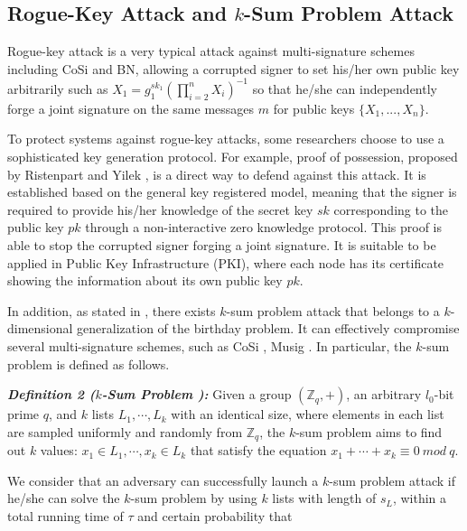 \documentclass[journal]{IEEEtran}
\begin{document}
\subsection{Rogue-Key Attack and \(k\)-Sum Problem Attack}

Rogue-key attack is a very typical attack against multi-signature schemes including CoSi and BN, allowing a corrupted signer to set his/her own public key arbitrarily such as \(X_1=g_1^{sk_1}(\prod_{i=2}^{n} X_i)^{-1}\) so that he/she can independently forge a joint signature on the same messages \(m\) for public keys \(\{X_1,...,X_n\}\).

To protect systems against rogue-key attacks, some researchers choose to use a sophisticated key generation protocol. For example, proof of possession, proposed by Ristenpart and Yilek \cite{05DBLP:conf/eurocrypt/RistenpartY07}, is a direct way to defend against this attack.
It is established based on the general key registered model, meaning that the signer is required to provide his/her knowledge of the secret key \(sk\) corresponding to the public key \(pk\) through a non-interactive zero knowledge protocol. This proof is able to stop the corrupted signer forging a joint signature. It is suitable to be applied in Public Key Infrastructure (PKI), where each node has its certificate showing the information about its own public key \(pk\).

In addition, as stated in \cite{03drijverssecurity}, there exists \(k\)-sum problem attack that belongs to a \(k\)-dimensional generalization of the birthday problem. It can effectively compromise several multi-signature schemes, such as CoSi \cite{02DBLP:conf/sp/SytaTVWJGGKF16}, Musig \cite{DBLP:journals/dcc/MaxwellPSW19}. In particular, the \(k\)-sum problem is defined as follows.

\noindent\emph{\bf Definition 2 (\(k\)-Sum Problem \cite{03drijverssecurity}):} Given a group \((\mathbb{Z}_q,+)\), an arbitrary \(l_0\)-bit prime \(q\), and \(k\) lists  \(L_1,\cdots,L_k\) with an identical size, where elements in each list are sampled uniformly and randomly from \(\mathbb{Z}_q\), the \(k\)-sum problem aims to find out \(k\) values: \(x_1\in L_1, \cdots,x_k \in L_k\) that satisfy the equation \(x_1+\cdots+x_k\equiv0\ mod\ q\).

We consider that an adversary can successfully launch a \(k\)-sum problem attack if he/she can solve the \(k\)-sum problem by using \(k\) lists with length of \(s_L\), within a total running time of \(\tau\) and certain probability that
\end{document}
